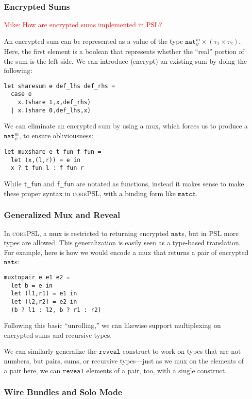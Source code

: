 \documentclass[10pt]{article}
\newcommand{\kw}[1]{\ensuremath{\mathtt{#1}}}
\newcommand{\tnat}{\ensuremath{\mathtt{nat}}}
\newcommand{\tpair}[2]{\ensuremath{{#1} \times {#2}}}
\newcommand{\lang}{\textsc{corePSL}\xspace}
\newcommand{\mwh}[1]{\textcolor{red}{Mike: #1}}
\begin{document}
\subsubsection{Encrypted Sums}

\mwh{How are encrypted sums implemented in PSL?}

  An encrypted sum can be represented as a value of the type
$\tpair{\tnat^m_\psi}{(\tpair{\tau_1}{\tau_2})}$. Here, the first
element is a boolean that represents whether the ``real'' portion of
the sum is the left side. We can introduce (encrypt) an existing sum
by doing the following:
\begin{verbatim}
let sharesum e def_lhs def_rhs =
  case e 
    x.(share 1,x,def_rhs)
  | x.(share 0,def_lhs,x)
\end{verbatim}
We can eliminate an encrypted sum by using a mux, which forces us
to produce a $\tnat^m_\psi$, to ensure obliviousness:
\begin{verbatim}
let muxshare e t_fun f_fun =
  let (x,(l,r)) = e in
  x ? t_fun l : f_fun r
\end{verbatim}
While \verb+t_fun+ and \verb+f_fun+ are notated as functions, instead
it makes sense to make these proper syntax in \lang, with a
binding form like $\kw{match}$.

\subsubsection{Generalized Mux and Reveal}
\label{sec:generalmux}

In \lang, a mux is restricted to returning encrypted
$\tnat$s, but in PSL more types are allowed. This generalization is
easily seen as a type-based translation. For example, here is how we
would encode a mux that returns a pair of encrypted 
$\tnat$s:
\begin{verbatim}
muxtopair e e1 e2 =
  let b = e in
  let (l1,r1) = e1 in
  let (l2,r2) = e2 in
  (b ? l1 : l2, b ? r1 : r2)
\end{verbatim}
Following this basic ``unrolling,'' we can likewise support
multiplexing on encrypted sums and recursive types.

We can similarly generalize the $\kw{reveal}$ construct to work on types
that are not numbers, but pairs, sums, or recursive types---just as we
mux on the elements of a pair here, we can \kw{reveal} elements
of a pair, too, with a single construct.

\subsubsection{Wire Bundles and Solo Mode}
\label{sec:wirebundles}
\end{document}
